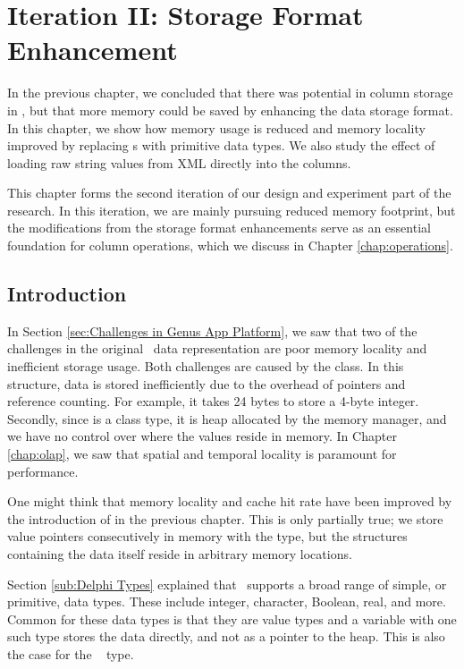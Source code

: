 \chapter{Iteration II: Storage Format Enhancement}
\label{chap:storage-format}
In the previous chapter, we concluded that there was potential in column storage in \gap, but that more memory could be saved by enhancing the data storage format. In this chapter, we show how memory usage is reduced and memory locality improved by replacing s with primitive data types. We also study the effect of loading raw string values from XML directly into the columns.

This chapter forms the second iteration of our design and experiment part of the research. In this iteration, we are mainly pursuing reduced memory footprint, but the modifications from the storage format enhancements serve as an essential foundation for column operations, which we discuss in Chapter \ref{chap:operations}.  
\clearpage

\section{Introduction}
\label{sec:Introduction}
In Section \ref{sec:Challenges in Genus App Platform}, we saw that two of the challenges in the original \gap~data representation are poor memory locality and inefficient storage usage. Both challenges are caused by the  class. In this structure, data is stored inefficiently due to the overhead of pointers and reference counting. For example, it takes 24 bytes to store a 4-byte integer. Secondly, since  is a class type, it is heap allocated by the memory manager, and we have no control over where the values reside in memory. In Chapter \ref{chap:olap}, we saw that spatial and temporal locality is paramount for performance.

One might think that memory locality and cache hit rate have been improved by the introduction of  in the previous chapter. This is only partially true; we store value pointers consecutively in memory with the  type, but the structures containing the data itself reside in arbitrary memory locations.

Section \ref{sub:Delphi Types} explained that \delphi~supports a broad range of simple, or primitive, data types. These include integer, character, Boolean, real, and more. Common for these data types is that they are value types and a variable with one such type stores the data directly, and not as a pointer to the heap. This is also the case for the \delphi~ type.

